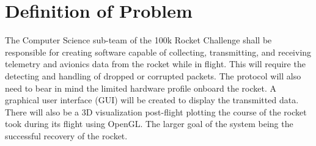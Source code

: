 \documentclass[onecolumn, draftclsnofoot,10pt, compsoc]{IEEEtran}
\begin{document}
\begin{titlepage}
\begin{singlespace}
\begin{abstract}
        \end{abstract}     
    \end{singlespace}
\end{titlepage}
\newpage
{}
\tableofcontents
\clearpage

\section{Definition of Problem}
The Computer Science sub-team of the 100k Rocket Challenge shall be responsible for creating software capable of collecting, transmitting, and receiving telemetry and avionics data from the rocket while in flight. This will require the detecting and handling of dropped or corrupted packets. The protocol will also need to bear in mind the limited hardware profile onboard the rocket. A graphical user interface (GUI) will be created to display the transmitted data. There will also be a 3D visualization post-flight plotting the course of the rocket took during its flight using OpenGL. The larger goal of the system being the successful recovery of the rocket.\par
\end{document}
